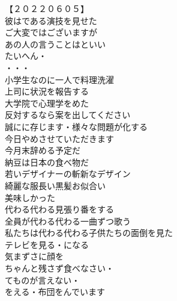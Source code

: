 \begin{multicols}{2}

【２０２２０６０５】\\
彼はである演技を見せた\\
ご大変ではございますが\\
あの人の言うことはといい\\
たいへん・\\
・・・\\
小学生なのに一人で料理洗濯\\

上司に状況を報告する\\
大学院で心理学をめた\\
反対するなら案を出してください\\
誠にに存じます・様々な問題が化する\\

今日やめさせていただきます\\
今月末辞める予定だ\\
納豆は日本の食べ物だ\\
若いデザイナーの斬新なデザイン\\

綺麗な服長い黒髪お似合い\\
美味しかった\\
代わる代わる見張り番をする\\
全員が代わる代わる一曲ずつ歌う\\
私たちは代わる代わる子供たちの面倒を見た\\

テレビを見る・になる\\
気まずさに顔を\\
ちゃんと残さず食べなさい・\\
てものが言えない・\\
をえる・布団をんでいます\\


\end{multicols}
